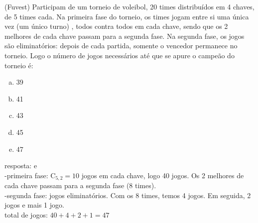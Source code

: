 \begin{ex}
 (Fuvest) Participam de um torneio de voleibol, 20 times distribuídos em 4 chaves, de 5 times cada. Na primeira fase do torneio, os times jogam entre si uma única vez (um único turno) , todos contra todos em cada chave, sendo que os 2 melhores de cada chave passam para a segunda fase. Na segunda fase, os jogos são eliminatórios: depois de cada partida, somente o vencedor permanece no torneio. Logo o número de jogos necessários até que se apure o campeão do torneio é:
    \begin{enumerate}[(a)]
    \item 39
    \item 41
    \item 43
    \item 45
    \item 47
    \end{enumerate}
      \begin{sol}
       resposta: e  \\
       -primeira fase: $\mathrm{C}_{5,2}=10$ jogos em cada chave, logo 40 jogos. Os 2 melhores de cada chave passam para a segunda fase  (8 times). \\
       -segunda fase: jogos eliminatórios. Com os 8 times, temos 4 jogos. Em seguida, 2 jogos e mais 1 jogo.\\
       total de jogos: $40+4+2+1=47$
      \end{sol}
\end{ex}